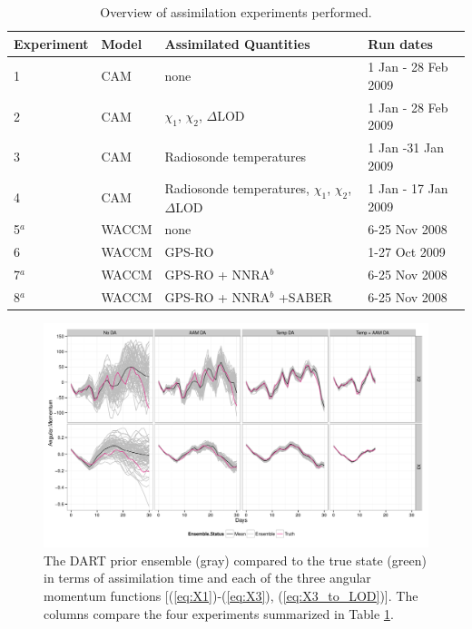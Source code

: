 
\begin{table}
\caption{Overview of assimilation experiments performed.}
\centering
\begin{tabular}{p{2cm}p{2cm}p{6cm}p{4cm}}
	Experiment& Model &  Assimilated Quantities  & Run dates \\
\hline
1 & CAM	&	none &  1 Jan - 28 Feb 2009 \\
2 & CAM &	$\chi_1$, $\chi_2$, $\Delta$LOD	& 1 Jan - 28 Feb 2009 \\
3 & CAM &	Radiosonde temperatures	& 1 Jan -31 Jan 2009	\\
4 & CAM &	Radiosonde temperatures, $\chi_1$, $\chi_2$, $\Delta$LOD	& 1 Jan - 17 Jan 2009\\
5$^a$ & WACCM &	none   & 6-25 Nov 2008	\\
6 & WACCM &	GPS-RO  & 1-27 Oct 2009	\\
7$^a$ & WACCM &	GPS-RO + NNRA$^b$  & 6-25 Nov 2008	\\
8$^a$ & WACCM &	GPS-RO + NNRA$^b$ +SABER & 6-25 Nov 2008\\	
\hline
\end{tabular}
\label{tab:expts}
\end{table}


 \begin{figure}
\includegraphics[width=\textwidth]{Paper_figures/ERPDA_paper_erpda_obs_space.pdf} 
 \caption{ The DART prior ensemble (gray) compared to the true state (green) in terms of assimilation time and each of the three angular momentum functions [(\ref{eq:X1})-(\ref{eq:X3}), (\ref{eq:X3_to_LOD})].  The columns compare the four experiments summarized in Table \ref{tab:expts}.  }
 \label{fig:fit_to_ERPs}
\end{figure}

